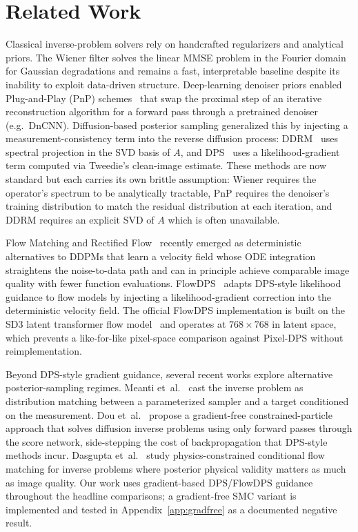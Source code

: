 \documentclass{article}
\begin{document}
\section{Related Work}

Classical inverse-problem solvers rely on handcrafted regularizers and
analytical priors. The Wiener filter solves the linear MMSE problem in
the Fourier domain for Gaussian degradations and remains a fast,
interpretable baseline despite its inability to exploit data-driven
structure. Deep-learning denoiser priors enabled Plug-and-Play (PnP)
schemes~\citep{chan2017pnp,zhang2017dncnn} that swap the proximal step
of an iterative reconstruction algorithm for a forward pass through a
pretrained denoiser (e.g.\ DnCNN). Diffusion-based posterior sampling
generalized this by injecting a measurement-consistency term into the
reverse diffusion process: DDRM~\citep{kawar2022ddrm} uses spectral
projection in the SVD basis of $A$, and DPS~\citep{chung2023dps} uses
a likelihood-gradient term computed via Tweedie's clean-image estimate.
These methods are now standard but each carries its own brittle
assumption: Wiener requires the operator's spectrum to be analytically
tractable, PnP requires the denoiser's training distribution to match
the residual distribution at each iteration, and DDRM requires an
explicit SVD of $A$ which is often unavailable.

Flow Matching and Rectified Flow~\citep{lipman2023flow,liu2023rectified}
recently emerged as deterministic alternatives to DDPMs that learn a
velocity field whose ODE integration straightens the noise-to-data
path and can in principle achieve comparable image quality with fewer
function evaluations. FlowDPS~\citep{kim2025flowdps} adapts DPS-style
likelihood guidance to flow models by injecting a likelihood-gradient
correction into the deterministic velocity field. The official FlowDPS
implementation is built on the SD3 latent transformer flow
model~\citep{esser2024sd3} and operates at $768\times768$ in latent
space, which prevents a like-for-like pixel-space comparison against
Pixel-DPS without reimplementation.

Beyond DPS-style gradient guidance, several recent works explore
alternative posterior-sampling regimes. Meanti et~al.~\citep{meanti2025dim}
cast the inverse problem as distribution matching between a
parameterized sampler and a target conditioned on the measurement.
Dou et~al.~\citep{dou2026particle} propose a gradient-free
constrained-particle approach that solves diffusion inverse problems
using only forward passes through the score network, side-stepping the
cost of backpropagation that DPS-style methods incur. Dasgupta
et~al.~\citep{dasgupta2026pcfm} study physics-constrained conditional
flow matching for inverse problems where posterior physical validity
matters as much as image quality. Our work uses gradient-based
DPS/FlowDPS guidance throughout the headline comparisons; a
gradient-free SMC variant is implemented and tested in
Appendix~\ref{app:gradfree} as a documented negative result.
\end{document}
